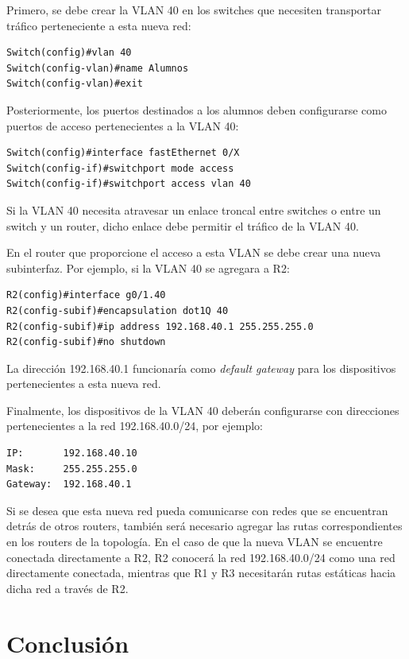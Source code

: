 \documentclass[12pt]{article}
\begin{document}
Primero, se debe crear la VLAN 40 en los switches que necesiten transportar
tráfico perteneciente a esta nueva red:

\begin{verbatim}
Switch(config)#vlan 40
Switch(config-vlan)#name Alumnos
Switch(config-vlan)#exit
\end{verbatim}

Posteriormente, los puertos destinados a los alumnos deben configurarse como
puertos de acceso pertenecientes a la VLAN 40:

\begin{verbatim}
Switch(config)#interface fastEthernet 0/X
Switch(config-if)#switchport mode access
Switch(config-if)#switchport access vlan 40
\end{verbatim}

Si la VLAN 40 necesita atravesar un enlace troncal entre switches o entre un
switch y un router, dicho enlace debe permitir el tráfico de la VLAN 40.

En el router que proporcione el acceso a esta VLAN se debe crear una nueva
subinterfaz. Por ejemplo, si la VLAN 40 se agregara a R2:

\begin{verbatim}
R2(config)#interface g0/1.40
R2(config-subif)#encapsulation dot1Q 40
R2(config-subif)#ip address 192.168.40.1 255.255.255.0
R2(config-subif)#no shutdown
\end{verbatim}

La dirección 192.168.40.1 funcionaría como \textit{default gateway} para
los dispositivos pertenecientes a esta nueva red.

Finalmente, los dispositivos de la VLAN 40 deberán configurarse con
direcciones pertenecientes a la red 192.168.40.0/24, por ejemplo:

\begin{verbatim}
IP:       192.168.40.10
Mask:     255.255.255.0
Gateway:  192.168.40.1
\end{verbatim}

Si se desea que esta nueva red pueda comunicarse con redes que se encuentran
detrás de otros routers, también será necesario agregar las rutas
correspondientes en los routers de la topología. En el caso de que la nueva
VLAN se encuentre conectada directamente a R2, R2 conocerá la red
192.168.40.0/24 como una red directamente conectada, mientras que R1 y R3
necesitarán rutas estáticas hacia dicha red a través de R2.


\section{Conclusión}
\end{document}
